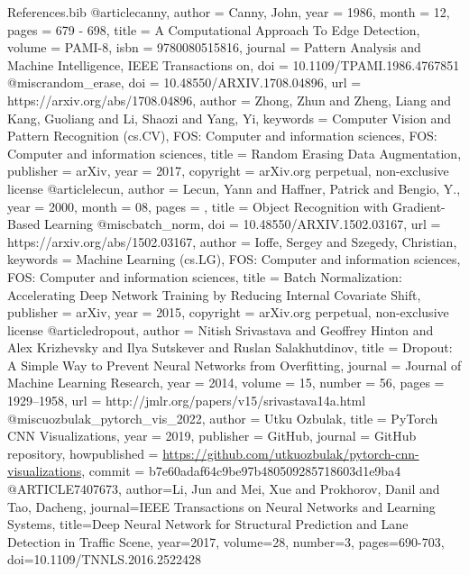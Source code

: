 \documentclass[a4paper,12pt,sort&compress]{article}
\begin{document}
\begin{filecontents}{References.bib}
    @article{canny,
        author = {Canny, John},
        year = {1986},
        month = {12},
        pages = {679 - 698},
        title = {A Computational Approach To Edge Detection},
        volume = {PAMI-8},
        isbn = {9780080515816},
        journal = {Pattern Analysis and Machine Intelligence, IEEE Transactions on},
        doi = {10.1109/TPAMI.1986.4767851}
        }
    @misc{random_erase,
        doi = {10.48550/ARXIV.1708.04896},
        url = {https://arxiv.org/abs/1708.04896},
        author = {Zhong, Zhun and Zheng, Liang and Kang, Guoliang and Li, Shaozi and Yang, Yi},
        keywords = {Computer Vision and Pattern Recognition (cs.CV), FOS: Computer and information sciences, FOS: Computer and information sciences},
        title = {Random Erasing Data Augmentation},
        publisher = {arXiv},
        year = {2017},
        copyright = {arXiv.org perpetual, non-exclusive license}
        }
    @article{lecun,
        author = {Lecun, Yann and Haffner, Patrick and Bengio, Y.},
        year = {2000},
        month = {08},
        pages = {},
        title = {Object Recognition with Gradient-Based Learning}
        }
    @misc{batch_norm,
        doi = {10.48550/ARXIV.1502.03167},
        url = {https://arxiv.org/abs/1502.03167},
        author = {Ioffe, Sergey and Szegedy, Christian},
        keywords = {Machine Learning (cs.LG), FOS: Computer and information sciences, FOS: Computer and information sciences},
        title = {Batch Normalization: Accelerating Deep Network Training by Reducing Internal Covariate Shift},
        publisher = {arXiv},
        year = {2015},
        copyright = {arXiv.org perpetual, non-exclusive license}
      }
    @article{dropout,
      author  = {Nitish Srivastava and Geoffrey Hinton and Alex Krizhevsky and Ilya Sutskever and Ruslan Salakhutdinov},
      title   = {Dropout: A Simple Way to Prevent Neural Networks from Overfitting},
      journal = {Journal of Machine Learning Research},
      year    = {2014},
      volume  = {15},
      number  = {56},
      pages   = {1929--1958},
      url     = {http://jmlr.org/papers/v15/srivastava14a.html}
    }
    @misc{uozbulak_pytorch_vis_2022,
        author = {Utku Ozbulak},
        title = {PyTorch CNN Visualizations},
        year = {2019},
        publisher = {GitHub},
        journal = {GitHub repository},
        howpublished = {\url{https://github.com/utkuozbulak/pytorch-cnn-visualizations}},
        commit = {b7e60adaf64c9be97b480509285718603d1e9ba4}
    }
    @ARTICLE{7407673,  author={Li, Jun and Mei, Xue and Prokhorov, Danil and Tao, Dacheng},
        journal={IEEE Transactions on Neural Networks and Learning Systems},   title={Deep Neural
        Network for Structural Prediction and Lane Detection in Traffic Scene},   year={2017},
        volume={28},  number={3},  pages={690-703},  doi={10.1109/TNNLS.2016.2522428}
    } 
      



\end{filecontents}






\newpage
\end{document}
